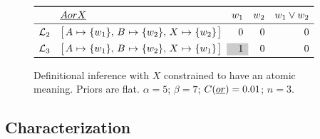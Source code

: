\documentclass{article}
\begin{document}
\begin{figure}[tp]
  \centering
  $\begin{array}[c]{l l r r r}
    \toprule
      & \word{A or X}  & w_{1} & w_{2} & w_{1} \vee w_{2} \\
    \midrule
    \Lex_{2} & \smallhurfordlex{w_{1}}{w_{2}}{w_{2}}        & 0 & 0 & 0 \\[1ex]
    \Lex_{3} & \smallhurfordlex{w_{1}}{w_{2}}{w_{1}}        & \graycell{1} & 0 & 0\\
    \bottomrule
  \end{array}$
  \caption{Definitional inference with $X$ constrained to have an atomic meaning. 
    Priors are flat. 
    $\alpha = 5$; 
    $\beta = 7$; 
    $C(\emph{or}) = 0.01$; 
    $n = 3$.}
  \label{fig:def-focal}
\end{figure}


\subsection{Characterization}\label{sec:analysis:characterization}
\end{document}
